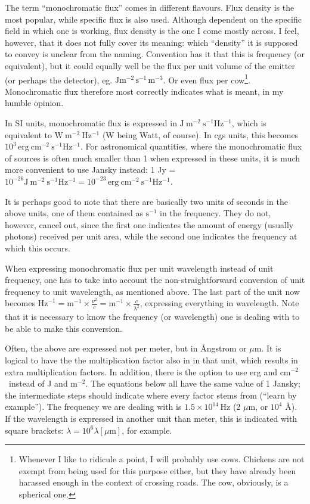 \documentclass[12pt,a4paper]{article}
\newcommand{\cmsq}{\ensuremath{\mathrm{cm}^{-2}}}
\newcommand{\micron}{\ensuremath{\mu \mathrm{m}}}
\newcommand{\jmsqshz}{\ensuremath{\mathrm{J}\ \mathrm{m}^{-2}\ \mathrm{s^{-1}} \mathrm{Hz^{-1}}}}
\newcommand{\ergcmsqshz}{\ensuremath{\mathrm{erg}\ \mathrm{cm}^{-2}\ \mathrm{s^{-1}} \mathrm{Hz^{-1}}}}
\begin{document}
The term ``monochromatic flux'' comes in different flavours. Flux density is the most popular, while specific flux is also used. Although dependent on the specific field in which one is working, flux density is the one I come mostly across. I feel, however, that it does not fully cover its meaning: which ``density'' it is supposed to convey is unclear from the naming. Convention has it that this is frequency (or equivalent), but it could equally well be the flux per unit volume of the emitter (or perhaps the detector), eg. $\mathrm{J m^{-2}}\, \mathrm{s^{-1}}\, \mathrm{m^{-3}}$. Or even flux per cow\footnote{Whenever I like to ridicule a point, I will probably use cows. Chickens are not exempt from being used for this purpose either, but they have already been harassed enough in the context of crossing roads. The cow, obviously, is a spherical one.}. Monochromatic flux therefore most correctly indicates what is meant, in my humble opinion. 


In SI units, monochromatic flux is expressed in \jmsqshz, which is equivalent to $\mathrm{W}\ \mathrm{m}^{-2}\ \mathrm{Hz^{-1}}$ (W being Watt, of course). In cgs units, this becomes $10^3\, \ergcmsqshz$. For astronomical quantities, where the monochromatic flux of sources is often much smaller than 1 when expressed in these units, it is much more convenient to use Jansky instead: 1 Jy = $10^{-26} \jmsqshz = 10^{-23}\, \ergcmsqshz$. 

It is perhaps good to note that there are basically two units of seconds in the above units, one of them contained as $\mathrm{s}^{-1}$ in the frequency. They do not, however, cancel out, since the first one indicates the amount of energy (usually photons) received per unit area, while the second one indicates the frequency at which this occurs.

When expressing monochromatic flux per unit wavelength instead of unit frequency, one has to take into account the non-straightforward conversion of unit frequency to unit wavelength, as mentioned above. The last part of the unit now becomes $\mathrm{Hz}^{-1} = \mathrm{m}^{-1} \times \frac{\nu^2}{c} = \mathrm{m}^{-1} \times \frac{c}{\lambda^2}$, expressing everything in wavelength. Note that it is necessary to know the frequency (or wavelength) one is dealing with to be able to make this conversion. 

Often, the above are expressed not per meter, but in {\AA}ngstrom or \micron. It is logical to have the the multiplication factor also in in that unit, which results in extra multiplication factors. In addition, there is the option to use erg and \cmsq\ instead of J and $\mathrm{m^{-2}}$. The equations below all have the same value of 1 Jansky; the intermediate steps should indicate where every factor stems from (``learn by example''). The frequency we are dealing with is $1.5 \times 10^{14}\, \mathrm{Hz}$ (2 \micron, or $10^4$ \AA). If the wavelength is expressed in another unit than meter, this is indicated with square brackets: $\lambda = 10^6 \lambda[\micron]$, for example.
\end{document}
